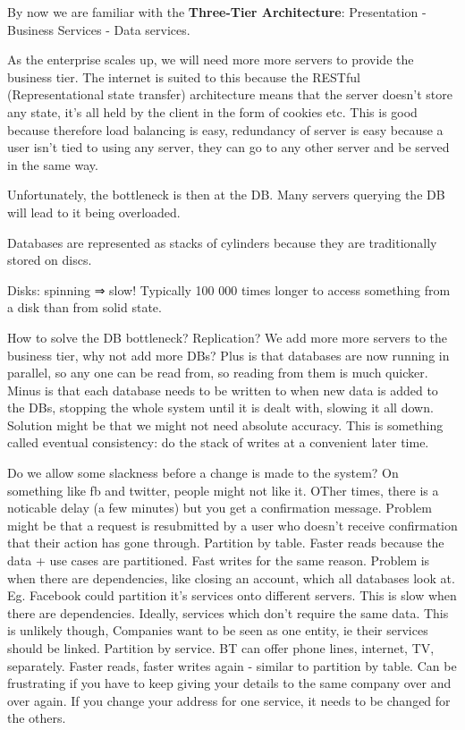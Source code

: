 \documentclass[11pt]{article}
\begin{document}
By now we are familiar with the \textbf{Three-Tier Architecture}: Presentation - Business Services - Data services.

As the enterprise scales up, we will need more more servers to provide the business tier. The internet is suited to this because the RESTful (Representational state transfer) architecture means that the server doesn’t store any state, it’s all held by the client in the form of cookies etc. This is good because therefore load balancing is easy, redundancy of server is easy because a user isn’t tied to using any server, they can go to any other server and be served in the same way.

Unfortunately, the bottleneck is then at the DB. Many servers querying the DB will lead to it being overloaded.

Databases are represented as stacks of cylinders because they are traditionally stored on discs.

Disks: spinning ⇒ slow! Typically 100 000 times longer to access something from a disk than from solid state.

How to solve the DB bottleneck?
Replication? We add more more servers to the business tier, why not add more DBs? Plus is that databases are now running in parallel, so any one can be read from, so reading from them is much quicker. Minus is that each database needs to be written to when new data is added to the DBs, stopping the whole system until it is dealt with, slowing it all down. Solution might be that we might not need absolute accuracy. This is something called eventual consistency: do the stack of writes at a convenient later time.

Do we allow some slackness before a change is made to the system? On something like fb and twitter, people might not like it. OTher times, there is a noticable delay (a few minutes) but you get a confirmation message. Problem might be that a request is resubmitted by a user who doesn’t receive confirmation that their action has gone through.
Partition by table. Faster reads because the data + use cases are partitioned. Fast writes for the same reason. Problem is when there are dependencies, like closing an account, which all databases look at. Eg. Facebook could partition it’s services onto different servers. This is slow when there are dependencies. Ideally, services which don’t require the same data. This is unlikely though, Companies want to be seen as one entity, ie their services should be linked.
Partition by service. BT can offer phone lines, internet, TV, separately. Faster reads, faster writes again - similar to partition by table. Can be frustrating if you have to keep giving your details to the same company over and over again. If you change your address for one service, it needs to be changed for the others. 
\end{document}
